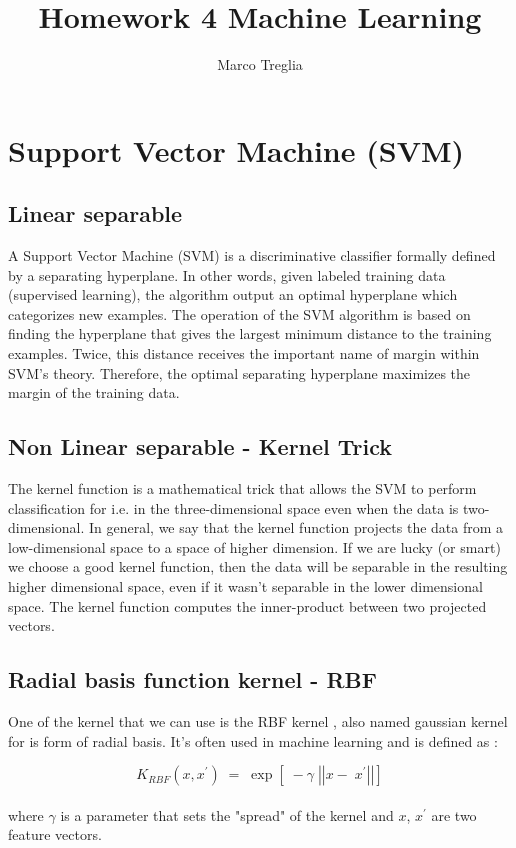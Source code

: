 \documentclass[11pt]{article}
\theoremstyle{plain}
\begin{document}
 


\title{Homework 4 Machine Learning}
\date{}
\author{Marco Treglia}
\maketitle

\section{Support Vector Machine (SVM)}
\subsection{Linear separable}
A Support Vector Machine (SVM) is a discriminative classifier formally defined by a separating hyperplane. In other words, given labeled training data (supervised learning), the algorithm output an optimal hyperplane which categorizes new examples. The operation of the SVM algorithm is based on finding the hyperplane that gives the largest minimum distance to the training examples. Twice, this distance receives the important name of margin within SVM’s theory. Therefore, the optimal separating hyperplane maximizes the margin of the training data. 

\subsection{Non Linear separable - Kernel Trick}
The kernel function is a mathematical trick that allows the SVM to perform classification for i.e. in the three-dimensional space even when the data is two-dimensional. In general, we say that the kernel function projects the data from a low-dimensional space to a space of higher dimension. If we are lucky (or smart)  we choose a good kernel function, then the data will be separable in the resulting higher dimensional space, even if it wasn’t separable in the lower dimensional space. The kernel function computes the inner-product between two projected vectors.

\subsection*{Radial basis function kernel - RBF}

One of the kernel that we can use is the RBF kernel , also named gaussian kernel for is form of radial basis. It's often used in machine learning and is defined as :

$$ K_{RBF}\left( x,x^{'} \right)\; =\; \exp \left[ \; -\gamma \; \left| \left| x-\; x^{'} \right| \right| \right] $$
\\
where $\gamma $ is a parameter that sets the "spread" of the kernel and $x$, $x^{'}$ are two feature vectors.
\end{document}
